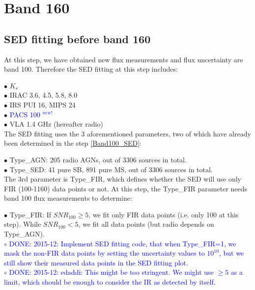 \documentclass[11pt,a4paper]{article}
\begin{document}
\clearpage

\section{Band 160}

\subsection{SED fitting before band 160}
\label{Band160_Galsed}

At this step, we have obtained new flux measurements and flux uncertainty are band 100. Therefore the SED fitting at this step includes:

\indent\hspace{15pt}$\bullet$ $K_s$
\\
\indent\hspace{15pt}$\bullet$ IRAC 3.6, 4.5, 5.8, 8.0
\\
\indent\hspace{15pt}$\bullet$ IRS PUI 16, MIPS 24
\\
\indent\hspace{15pt}$\bullet$ \textcolor{blue}{PACS 100 $^{new!}$}
\\
\indent\hspace{15pt}$\bullet$ VLA 1.4 GHz (hereafter radio) 
\\

The SED fitting uses the 3 aforementioned parameters, two of which have already been determined in the step \ref{Band100_SED}:

\indent\hspace{15pt}$\bullet$ 
Type\_AGN: 205 radio AGNs, out of 3306 sources in total. 
\\
\indent\hspace{15pt}$\bullet$ 
Type\_SED: 41 pure SB, 891 pure MS, out of 3306 sources in total. 
\\

The 3rd parameter is Type\_FIR, which defines whether the SED will use only FIR (100-1160) data points or not. At this step, the Type\_FIR parameter needs band 100 flux measurements to determine: 

\indent\hspace{15pt}$\bullet$ 
Type\_FIR: If $SNR_{100} \ge 5$, we fit only FIR data points (i.e. only 100 at this step). While $SNR_{100} < 5$, we fit all data points (but radio depends on Type\_AGN).
\\
\indent\hspace{15pt}$\circ$ 
\textcolor{blue}{DONE: 2015-12: Implement SED fitting code, that when Type\_FIR=1, we mask the non-FIR data points by setting the uncertainty values to $10^{10}$, but we still show their measured data points in the SED fitting plot. }
\\
\indent\hspace{15pt}$\circ$ 
\textcolor{blue}{DONE: 2015-12: edaddi: This might be too stringent. We might use $\ge 5$ as a limit, which should be enough to consider the IR as detected by itself.}
\\
\end{document}
